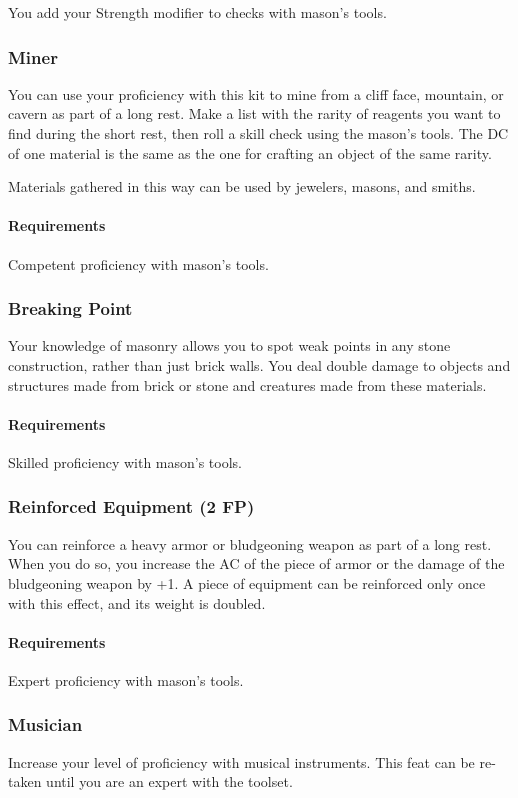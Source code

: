     You add your Strength modifier to checks with mason's tools.
\subsubsection{Miner} \label{feat::miner}
    You can use your proficiency with this kit to mine from a cliff face, mountain, or cavern as part of a long rest.
    Make a list with the rarity of reagents you want to find during the short rest, then roll a skill check using the mason's tools.
    The DC of one material is the same as the one for crafting an object of the same rarity.

    Materials gathered in this way can be used by jewelers, masons, and smiths.
    \paragraph{Requirements} Competent proficiency with mason's tools.
\subsubsection{Breaking Point} \label{feat::breakingpoint}
    Your knowledge of masonry allows you to spot weak points in any stone construction, rather than just brick walls.
    You deal double damage to objects and structures made from brick or stone and creatures made from these materials.
    \paragraph{Requirements} Skilled proficiency with mason's tools.
\subsubsection{Reinforced Equipment (2 FP)} \label{feat::reinforcedequipment}
    You can reinforce a heavy armor or bludgeoning weapon as part of a long rest.
    When you do so, you increase the AC of the piece of armor or the damage of the bludgeoning weapon by +1.
    A piece of equipment can be reinforced only once with this effect, and its weight is doubled.
    \paragraph{Requirements} Expert proficiency with mason's tools.

\subsubsection{Musician} \label{feat::musician}
    Increase your level of proficiency with musical instruments.
    This feat can be re-taken until you are an expert with the toolset.


